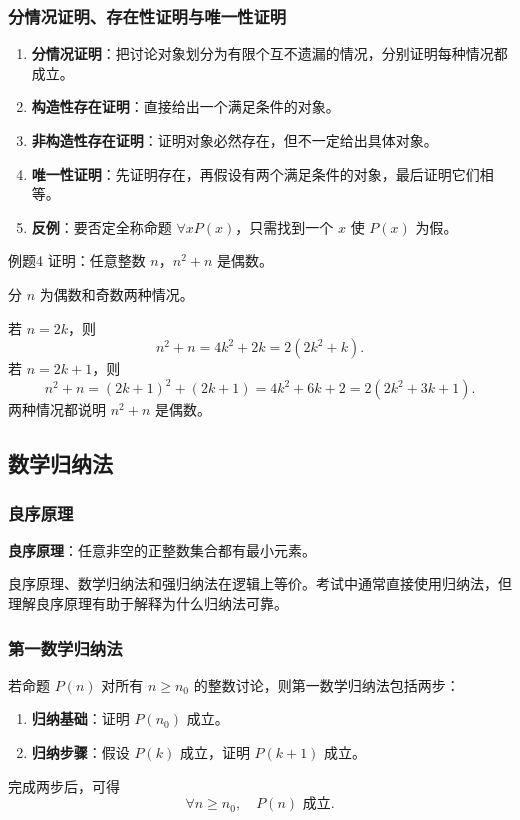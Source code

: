\subsubsection{分情况证明、存在性证明与唯一性证明}

\begin{enumerate}
	\item \textbf{分情况证明}：把讨论对象划分为有限个互不遗漏的情况，分别证明每种情况都成立。
	\item \textbf{构造性存在证明}：直接给出一个满足条件的对象。
	\item \textbf{非构造性存在证明}：证明对象必然存在，但不一定给出具体对象。
	\item \textbf{唯一性证明}：先证明存在，再假设有两个满足条件的对象，最后证明它们相等。
	\item \textbf{反例}：要否定全称命题 \(\forall xP(x)\)，只需找到一个 \(x\) 使 \(P(x)\) 为假。
\end{enumerate}

\begin{question}{例题4}
	证明：任意整数 \(n\)，\(n^2+n\) 是偶数。
	
	\begin{solution}
	分 \(n\) 为偶数和奇数两种情况。
	
	若 \(n=2k\)，则
	\[
	n^2+n=4k^2+2k=2(2k^2+k).
	\]
	若 \(n=2k+1\)，则
	\[
	n^2+n=(2k+1)^2+(2k+1)=4k^2+6k+2=2(2k^2+3k+1).
	\]
	两种情况都说明 \(n^2+n\) 是偶数。
	\end{solution}
\end{question}

\subsection{数学归纳法}

\subsubsection{良序原理}

\textbf{良序原理}：任意非空的正整数集合都有最小元素。

良序原理、数学归纳法和强归纳法在逻辑上等价。考试中通常直接使用归纳法，但理解良序原理有助于解释为什么归纳法可靠。

\subsubsection{第一数学归纳法}

若命题 \(P(n)\) 对所有 \(n\ge n_0\) 的整数讨论，则第一数学归纳法包括两步：
\begin{enumerate}
	\item \textbf{归纳基础}：证明 \(P(n_0)\) 成立。
	\item \textbf{归纳步骤}：假设 \(P(k)\) 成立，证明 \(P(k+1)\) 成立。
\end{enumerate}
完成两步后，可得
\[
\forall n\ge n_0,\quad P(n)\text{ 成立}.
\]

